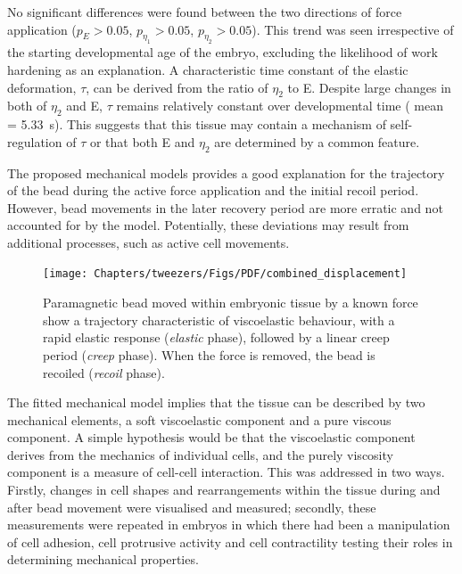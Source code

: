 No significant differences were found between the two directions of force application ($p_E > 0.05$, $p_{\eta_1} > 0.05$, $p_{\eta_2} > 0.05$).
This trend was seen irrespective of the starting developmental age of the embryo, excluding the likelihood of work hardening as an explanation.
A characteristic time constant of the elastic deformation, $\tau$, can be derived from the ratio of $\eta_2$ to E.
Despite large changes in both of $\eta_2$ and E, $\tau$ remains relatively constant over developmental time (%
mean = \SI{5.33}{\second}).
This suggests that this tissue may contain a mechanism of self-regulation of $\tau$ or that both E and $\eta_2$ are determined by a common feature.

The proposed mechanical models provides a good explanation for the trajectory of the bead during the active force application and the initial recoil period.
However, bead movements in the later recovery period are more erratic and not accounted for by the model.
Potentially, these deviations may result from additional processes, such as active cell movements.

\begin{figure}
  \centering
  \texttt{[image: Chapters/tweezers/Figs/PDF/combined\_displacement]}
  \caption{Paramagnetic bead moved within embryonic tissue by a known force show a trajectory characteristic of viscoelastic behaviour, with a rapid elastic response (\emph{elastic} phase), followed by a linear creep period (\emph{creep} phase).
  When the force is removed, the bead is recoiled (\emph{recoil} phase).
  }
\end{figure}

The fitted mechanical model implies that the tissue can be described by two mechanical elements, a soft viscoelastic component and a pure viscous component.
A simple hypothesis would be that the viscoelastic component derives from the mechanics of individual cells, and the purely viscosity component is a measure of cell-cell interaction.
This was addressed in two ways.
Firstly, changes in cell shapes and rearrangements within the tissue during and after bead movement were visualised and measured; secondly, these measurements were repeated in embryos in which there had been a manipulation of cell adhesion, cell protrusive activity and cell contractility testing their roles in determining mechanical properties.

